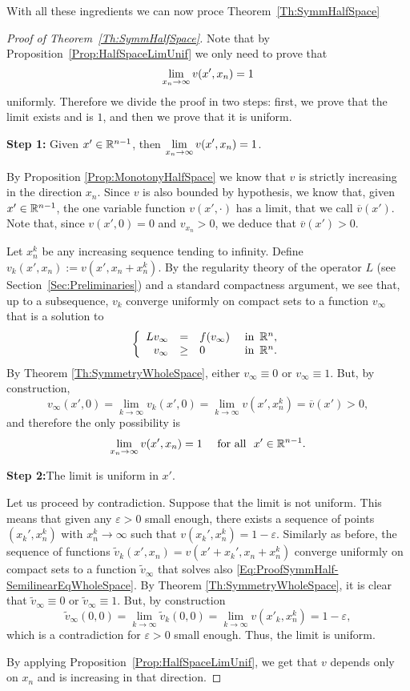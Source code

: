 With all these ingredients we can now proce Theorem~\ref{Th:SymmHalfSpace}

\begin{proof}[Proof of Theorem~\ref{Th:SymmHalfSpace}]
Note that by Proposition~\ref{Prop:HalfSpaceLimUnif} we only need to prove that 
$$
\displaystyle \lim_{x_n\to \infty} v(x',x_n) = 1
$$
uniformly. Therefore we divide the proof in two steps: first, we prove that the limit exists and is $1$, and then we prove that it is uniform.


\textbf{Step 1:} Given $x'\in \mathbb{R}^{n-1}$, then  $\displaystyle \lim_{x_n\to \infty} v(x',x_n) = 1$.

By Proposition \ref{Prop:MonotonyHalfSpace} we know that $v$ is strictly increasing in the direction $x_n$. Since $v$ is also bounded by hypothesis, we know that, given $x'\in\mathbb{R}^{n-1}$, the one variable function $v(x',\cdot)$ has a limit, that we call $\overline{v}(x')$. Note that, since $v(x',0) = 0$ and $v_{x_n}>0$, we deduce that $\overline{v}(x') > 0$.

Let $x_n^k$ be any increasing sequence tending to infinity. Define $v_k(x',x_n) := v(x',x_n+x_n^k)$. By the regularity theory of the operator $L$ (see Section~\ref{Sec:Preliminaries}) and a standard compactness argument, we see that, up to a subsequence, $v_k$ converge uniformly on compact sets to a function $v_\infty$ that is a solution to
\begin{equation}
\label{Eq:ProofSymmHalf-SemilinearEqWholeSpace}
\left\{\begin{array}{rcll}
Lv_\infty &=& f(v_\infty)   &\textrm{ in } \,\mathbb{R}^n,\\
v_\infty &\geq& 0   &\textrm{ in } \,\mathbb{R}^n.
\end{array} \right.
\end{equation}
By Theorem \ref{Th:SymmetryWholeSpace}, either $v_\infty\equiv 0$ or $v_\infty \equiv 1$. But, by construction,
$$ v_\infty(x',0) = \lim_{k\to \infty} v_k(x',0) = \lim_{k\to \infty} v(x',x_n^k) = \overline{v}(x') > 0, $$
and therefore the only possibility is
$$ \lim_{x_n\to \infty} v(x',x_n) = 1 \quad \text{ for all } \ x'\in\mathbb{R}^{n-1}. $$

\textbf{Step 2:}The limit is uniform in $x'$.

Let us proceed by contradiction. Suppose that the limit is not uniform. This means that given any $\varepsilon>0$ small enough, there exists a sequence of points $(x_k',x_n^k)$ with $x_n^k\to \infty$ such that $v(x_k',x_n^k) = 1-\varepsilon$. Similarly as before, the sequence of functions $\tilde{v}_k(x',x_n) = v(x'+x_k',x_n+x_n^k)$ converge uniformly on compact sets to a function $\tilde{v}_\infty$ that solves also \eqref{Eq:ProofSymmHalf-SemilinearEqWholeSpace}. By Theorem \ref{Th:SymmetryWholeSpace}, it is clear that $\tilde{v}_\infty\equiv 0$ or $\tilde{v}_\infty \equiv 1$. But, by construction
$$ \tilde{v}_\infty(0,0) = \lim_{k\to \infty} \tilde{v}_k(0,0) = \lim_{k\to \infty} v(x'_k,x_n^k) = 1-\varepsilon, $$
which is a contradiction for $\varepsilon>0$ small enough. Thus, the limit is uniform. 

By applying Proposition~\ref{Prop:HalfSpaceLimUnif}, we get that $v$ depends only on $x_n$ and is increasing in that direction.
\end{proof}

